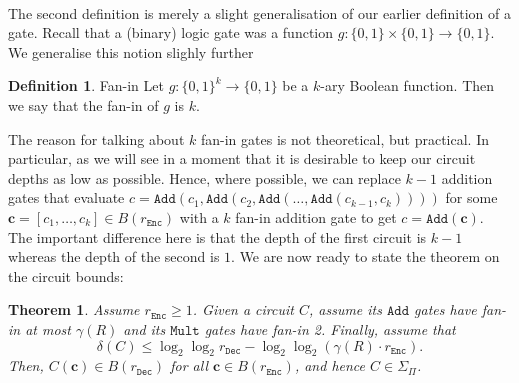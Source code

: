 \documentclass{article}
\newtheorem{theorem}{Theorem}[section]
\theoremstyle{definition}
\newtheorem{definition}{Definition}[section]
\theoremstyle{example}
\newcommand{\Enc}{\texttt{Enc}}
\newcommand{\Dec}{\texttt{Dec}}
\newcommand{\Add}{\texttt{Add}}
\newcommand{\Mult}{\texttt{Mult}}
\renewcommand{\vec}[1]{\mathbf{#1}}
\begin{document}
\paragraph{} The second definition is merely a slight generalisation of our earlier
definition of a gate. Recall that a (binary) logic gate was a function $g: \{0,
1\} \times \{0, 1\} \to \{0, 1\}$. We generalise this notion slighly further
\begin{definition}{Fan-in}
  Let $g: \{0, 1\}^k \to \{0, 1\}$ be a $k$-ary Boolean function. Then we say
  that the fan-in of $g$ is $k$. 
\end{definition}
The reason for talking about $k$ fan-in gates is not theoretical, but practical.
In particular, as we will see in a moment that it is desirable to keep our
circuit depths as low as possible. Hence, where possible, we can replace $k - 1$
addition gates that evaluate $c = \Add(c_1, \Add(c_2, \Add(\hdots, \Add(c_{k-1},
c_{k}))))$ for some $\vec{c} = [c_1, \hdots, c_k] \in B(r_\Enc)$ with a $k$
fan-in addition gate to get $c = \Add(\vec{c})$. The important difference here
is that the depth of the first circuit is $k-1$ whereas the depth of the second
is $1$.
We are now ready to state the theorem on the circuit bounds:
\begin{theorem}
  Assume $r_\Enc \geq 1$. Given a circuit $C$, assume its $\Add$ gates have
  fan-in at most $\gamma(R)$ and its $\Mult$ gates have fan-in 2.
  Finally, assume that
  \[
    \delta(C) \leq \log_2\log_2 r_\Dec - \log_2\log_2(\gamma(R) \cdot r_\Enc).
  \]
  Then, $C(\vec{c}) \in B(r_\Dec)$ for all $\vec{c} \in B(r_\Enc)$, and hence $C
  \in \Sigma_\Pi$.
\end{theorem}
\end{document}
